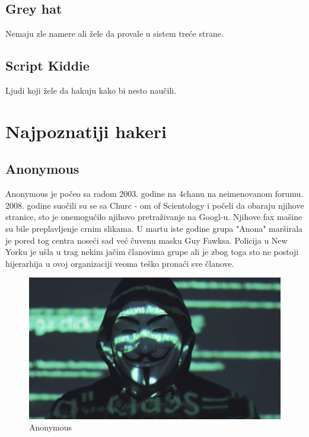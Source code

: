 \documentclass[a4paper]{article}
\begin{document}
\subsection{Grey hat}
Nemaju zle namere ali žele da provale u sistem treće strane.
\subsection{Script Kiddie}
Ljudi koji žele da hakuju kako bi nesto naučili.
\newpage



\section{Najpoznatiji hakeri}
\label{hakeri}

\subsection{Anonymous}
Anonymous je počeo sa radom 2003. godine na 4chanu na neimenovanom forumu. 2008. godine suočili su se sa Churc - om of Scientology i počeli da obaraju njihove stranice, sto je onemogućilo njihovo pretraživanje na Googl-u. Njihove fax mašine su bile preplavljenje crnim slikama. U martu iste godine grupa "Anona" marširala je pored tog centra noseći sad već čuvenu masku  Guy Fawksa. Policija u New Yorku je ušla u trag nekim jačim članovima grupe ali je zbog toga sto ne postoji hijerarhija u ovoj organizaciji veoma teško pronaći sve članove.





\begin{figure}[h!]
\begin{center}
\includegraphics[scale=0.10]{anonymous.jpg}
\end{center}
\caption{Anonymous}
\label{fig:anonymous}
\end{figure}
\end{document}
